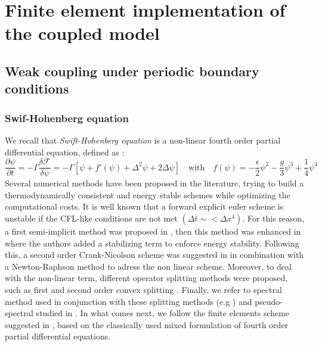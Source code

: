 \documentclass{article}
\begin{document}
\section{Finite element implementation of the coupled model}
\subsection{Weak coupling under periodic boundary conditions}
\subsubsection{Swif-Hohenberg equation}
We recall that \textit{Swift-Hohenberg equation} is a non-linear fourth order partial differential equation, defined as :
\begin{equation}\label{eq:SH4th}
   \frac{\partial \psi}{\partial t} = - \Gamma \frac{\delta \mathcal{F}}{\delta \psi} = - \Gamma \left[ \psi + f'(\psi) + \Delta^2 \psi +2 \Delta \psi  \right] \quad \text{with} \quad f(\psi) = -\frac{\epsilon}{2} \psi^2 - \frac{g}{3}\psi^3 + \frac{1}{4} \psi^4
\end{equation}
Several numerical methods have been proposed in the literature, trying to build a thermodynamically consistent and energy stable schemes while optimizing the computational costs.
It is well known that a forward explicit euler scheme is unstable if the CFL-like conditions are not met $(\Delta t\sim < \Delta x^4)$. For this reason, a first semi-implicit method was proposed in \cite{chengEfficientAlgorithmSolving2008}, then this method was enhanced in \cite{elseySimpleEfficientScheme2013} where the authors added a stabilizing term to enforce energy stability. Following this, a second order Crank-Nicolson scheme was suggested in \cite{gomezNewSpaceTime2012} in combination with a Newton-Raphson method to adress the non linear scheme. Moreover, to deal with the non-linear term, different operator splitting methods were proposed, such as first and second order convex splitting \cite{huStableEfficientFinitedifference2009}. Finally, we refer to spectral method used in conjunction with these splitting methods (e.g \cite{leeSemianalyticalFourierSpectral2017}) and pseudo-spectral studied in \cite{zhaiStabilityErrorEstimate2021}.
In what comes next, we follow the finite elements scheme suggested in \cite{qiNumericalAnalysisSecondorder2024}, based on the classically used mixed formulation of fourth order partial differential equations.\\
\end{document}
